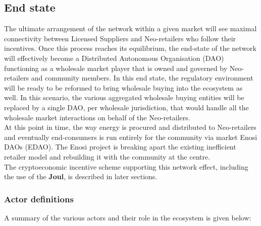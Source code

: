 \documentclass{article}
\theoremstyle{definition}
\theoremstyle{plain} %
\begin{document}
\subsection{End state}

The ultimate arrangement of the network within a given market will see maximal connectivity between Licensed Suppliers and Neo-retailers who follow their incentives. Once this process reaches its equilibrium, the end-state of the network will effectively become a Distributed Autonomous Organisation (DAO) functioning as a wholesale market player that is owned and governed by Neo-retailers and community members. In this end state, the regulatory environment will be ready to be reformed to bring wholesale buying into the ecosystem as well. In this scenario, the various aggregated wholesale buying entities will be replaced by a single DAO, per wholesale jurisdiction, that would handle all the wholesale market interactions on behalf of the Neo-retailers. \\

\noindent At this point in time, the way energy is procured and distributed to Neo-retailers and eventually end-consumers is run entirely for the community via market Enosi DAOs (EDAO). The Enosi project is breaking apart the existing inefficient retailer model and rebuilding it with the community at the centre.\\

\noindent The cryptoeconomic incentive scheme supporting this network effect, including the use of the \textbf{Joul}, is described in later sections.

\subsubsection{Actor definitions}

A summary of the various actors and their role in the ecosystem is given below:\\
\end{document}
